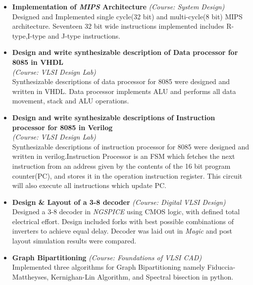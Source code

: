 \documentclass[a4paper,10pt]{article}
\begin{document}
 \begin{itemize}
  \setlength{\itemsep}{1pt}

  \item \textbf{{Implementation of \textit{MIPS} Architecture}} \textit{(Course: System Design)}\\
	Designed and Implemented single cycle(32 bit) and multi-cycle(8 bit)  MIPS architecture.
	Seventeen 32 bit wide instructions implemented includes R-type,I-type and J-type instructions.
   

  \item \textbf{{Design and write synthesizable description of Data processor for 8085 in VHDL}}\\ \textit{(Course: VLSI Design Lab)}\\
	Synthesizable descriptions of data processor for 8085 were designed and written in VHDL.  Data processor implements ALU and performs  all data movement, stack and ALU operations.
	
  \item \textbf{{Design and write synthesizable descriptions of Instruction processor for 8085 in Verilog}}\\ \textit{(Course: VLSI Design Lab)}\\
	Synthesizable descriptions of instruction processor for 8085 were designed and written in verilog.Instruction Processor is an FSM which
	fetches the next instruction from an address given by the contents of the 16 bit program counter(PC), and stores it in the operation instruction register. This circuit will also execute all instructions which update PC.

  \item \textbf{{Design \& Layout of a 3-8 decoder}}   \textit{(Course: Digital VLSI Design)}\\
	Designed a 3-8 decoder in \textit{NGSPICE} using CMOS logic, with defined total electrical effort. Design included forks with
	best possible combinations of inverters to achieve equal delay. Decoder was laid out in \textit{Magic} and post layout
	simulation results were compared.

  \item \textbf{{Graph Bipartitioning}} \textit{(Course: Foundations of VLSI CAD)}\\
	Implemented three algorithms for Graph Bipartitioning namely Fiduccia-Mattheyses, Kernighan-Lin Algorithm, and Spectral bisection
	in python.
	

\end{itemize}
\end{document}
